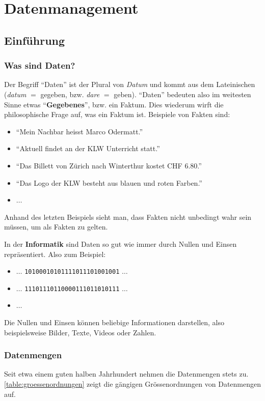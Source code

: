 \setcounter{chapter}{4}

\chapter{Datenmanagement}\label{ch:Lektion}
\section{Einführung}

\subsection{Was sind Daten?}

Der Begriff \enquote{Daten} ist der Plural von \textit{Datum} und kommt aus dem Lateinischen (\textit{datum} $=$ gegeben,
bzw. \textit{dare} $=$ geben). \enquote{Daten} bedeuten also im weitesten Sinne etwas \enquote{\textbf{Gegebenes}}, bzw. ein Faktum. Dies wiederum wirft die philosophische Frage auf, was ein Faktum ist. Beispiele von Fakten sind:
\begin{itemize}
  \item \enquote{Mein Nachbar heisst Marco Odermatt.}
  \item \enquote{Aktuell findet an der KLW Unterricht statt.}
  \item \enquote{Das Billett von Zürich nach Winterthur kostet CHF 6.80.}
  \item \enquote{Das Logo der KLW besteht aus blauen und roten Farben.}
  \item $\ldots$
\end{itemize}
Anhand des letzten Beispiels sieht man, dass Fakten nicht unbedingt wahr sein müssen, um als Fakten zu gelten.

In der \textbf{Informatik} sind Daten so gut wie immer durch Nullen und Einsen repräsentiert. Also zum Beispiel:
\begin{itemize}
  \item $\ldots$ \verb|10100010101111011101001001| $\ldots$
  \item $\ldots$ \verb|11101110110000111011010111| $\ldots$
  \item $\ldots$
\end{itemize}
Die Nullen und Einsen können beliebige Informationen darstellen, also beispielsweise Bilder, Texte, Videos oder Zahlen.

\subsection{Datenmengen}
Seit etwa einem guten halben Jahrhundert nehmen die Datenmengen stets zu. \cref{table:groessenordnungen} zeigt die gängigen Grössenordnungen von Datenmengen auf.

